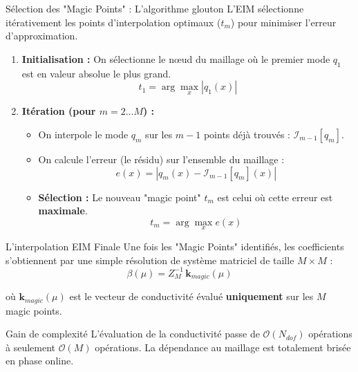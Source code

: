 \documentclass[aspectratio=169]{beamer}
\begin{document}
\begin{frame}{Sélection des "Magic Points" : L'algorithme glouton}
L'EIM sélectionne itérativement les points d'interpolation optimaux ($t_m$) pour minimiser l'erreur d'approximation.

\vspace{0.3cm}
\begin{enumerate}
    \item<1-> \textbf{Initialisation :} On sélectionne le nœud du maillage où le premier mode $q_1$ est en valeur absolue le plus grand.
    \[ t_1 = \arg\max_x |q_1(x)| \]
    
    \item<2-> \textbf{Itération (pour $m=2 \dots M$) :}
    \begin{itemize}
        \item On interpole le mode $q_m$ sur les $m-1$ points déjà trouvés : $\mathcal{I}_{m-1}[q_m]$.
        \item On calcule l'erreur (le résidu) sur l'ensemble du maillage :
        \[ e(x) = \left| q_m(x) - \mathcal{I}_{m-1}[q_m](x) \right| \]
        \item<3-> \textbf{Sélection :} Le nouveau "magic point" $t_m$ est celui où cette erreur est \textbf{maximale}.
        \[ t_m = \arg\max_x e(x) \]
    \end{itemize}
\end{enumerate}

\vspace{0.1cm}
\end{frame}

\begin{frame}{L'interpolation EIM Finale}
Une fois les "Magic Points" identifiés, les coefficients s'obtiennent par une simple résolution de système matriciel de taille $M \times M$ :
\[
\beta(\mu) = Z_M^{-1} \, \mathbf{k}_{magic}(\mu)
\]

\vspace{0.2cm}
où $\mathbf{k}_{magic}(\mu)$ est le vecteur de conductivité évalué \textbf{uniquement} sur les $M$ magic points.

\vspace{0.4cm}
\begin{alertblock}{Gain de complexité}
L'évaluation de la conductivité passe de $\mathcal{O}(N_{dof})$ opérations à seulement $\mathcal{O}(M)$ opérations. La dépendance au maillage est totalement brisée en phase online.
\end{alertblock}

\end{frame}
\end{document}
